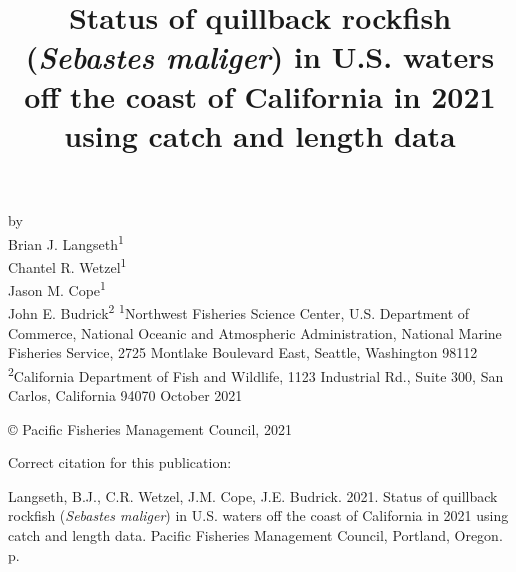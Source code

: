 \documentclass[11pt,
  english,
  a4paper,
]{article}
\date{}
\newcommand{\trTitle}{Status of quillback rockfish (\emph{Sebastes maliger}) in U.S. waters off the coast of California in 2021 using catch and length data}
\newcommand{\trYear}{2021}
\newcommand{\trMonth}{October}
\newcommand{\trAuthsBack}{Langseth, B.J., C.R. Wetzel, J.M. Cope, J.E. Budrick}
\newcommand{\trCitation}{
\begin{hangparas}{1em}{1}
\trAuthsBack{}. \trYear{}. \trTitle{}. Pacific Fisheries Management Council, Portland, Oregon. \pageref{LastPage}{}\,p.
\end{hangparas}}
\begin{document}

\renewcommand*{\thefootnote}{\fnsymbol{footnote}}

\small
\thispagestyle{empty}
\noindent
\begin{center}
\title{Status of quillback rockfish (\emph{Sebastes maliger}) in U.S. waters off the coast of California in 2021 using catch and length data}
\vspace{1.5cm}
{\Large\textbf{}}
\vfill
by\\
Brian J. Langseth\textsuperscript{1}\\
Chantel R. Wetzel\textsuperscript{1}\\
Jason M. Cope\textsuperscript{1}\\
John E. Budrick\textsuperscript{2}\vfill
\textsuperscript{1}Northwest Fisheries Science Center, U.S. Department of Commerce, National Oceanic and Atmospheric Administration, National Marine Fisheries Service, 2725 Montlake Boulevard East, Seattle, Washington 98112\\
\textsuperscript{2}California Department of Fish and Wildlife, 1123 Industrial Rd., Suite 300, San Carlos, California 94070\vfill
\trMonth{} \trYear{}
\end{center}
\clearpage

\thispagestyle{empty}
\vspace*{\fill}
\begin{center}
\copyright{} Pacific Fisheries Management Council, \trYear{}\\
\end{center}
\par
\bigskip
\noindent
Correct citation for this publication:
\bigskip
\par
\trCitation{}
\clearpage


\tableofcontents\clearpage
\label{TRlastRoman}
\clearpage

\newpage
\thispagestyle{empty} %

\pagestyle{plain}  %
\renewcommand*{\thefootnote}{\arabic{footnote}}  %
\setcounter{footnote}{0}  %
\renewcommand{\headrulewidth}{0.5pt}
\renewcommand{\footrulewidth}{0.5pt}
\end{document}
